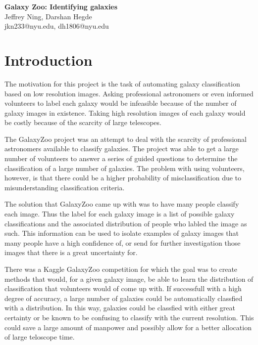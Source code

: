 \documentclass[10pt]{article}
\date{05/16/2014}
\begin{document}
\begin{flushleft}
{\Large
\textbf{Galaxy Zoo: Identifying galaxies}
}
\\
Jeffrey Ning, 
Darshan Hegde 
\\
jkn233@nyu.edu, dh1806@nyu.edu
\end{flushleft}

\section*{Introduction}
The motivation for this project is the task of automating galaxy classification based on low
resolution images. Asking professional astronomers or even informed volunteers to label each galaxy
would be infeasible because of the number of galaxy images in existence. Taking high resolution
images of each galaxy would be costly because of the scarcity of large telescopes.

The GalaxyZoo project was an attempt to deal with the scarcity of professional astronomers
available to classify galaxies. The project was able to get a large number of volunteers to answer a
series of guided questions to determine the classification of a large number of galaxies. The
problem with using volunteers, however, is that there could be a higher probability of
misclassification due to misunderstanding classification criteria.

The solution that GalaxyZoo came up with was to have many people classify each image. Thus the
label for each galaxy image is a list of possible galaxy classifications and the associated 
distribution of people who labled the image as such. This information can be used to isolate
examples of galaxy images that many people have a high confidence of, or send for further
investigation those images that there is a great uncertainty for.

There was a Kaggle GalaxyZoo competition for which the goal was to create methods that would, for a
given galaxy image, be able to learn the distribution of classification that volunteers would of
come up with. If successfull with a high degree of accuracy, a large number of galaxies could be
automatically classfied with a distribution. In this way, galaxies could be classfied with either
great certainty or be known to be confusing to classify with the current resolution. This could save
a large amount of manpower and possibly allow for a better allocation of large teloscope time.
\end{document}

